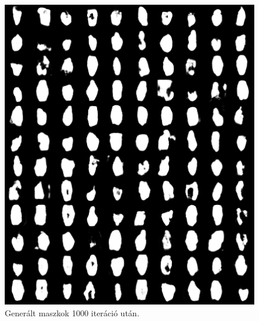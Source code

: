 \documentclass[12pt,a4]{article}
\begin{document}
        \begin{figure}[h!]
          \centering
          \begin{minipage}[b]{0.4\textwidth}
            \includegraphics[width=\textwidth]{test-masks-1000.png}
            \caption{Generált maszkok 1000 iteráció után.}
          \end{minipage}
          \hfill
          \begin{minipage}[b]{0.4\textwidth}

\end{minipage}
\end{figure}
\end{document}

